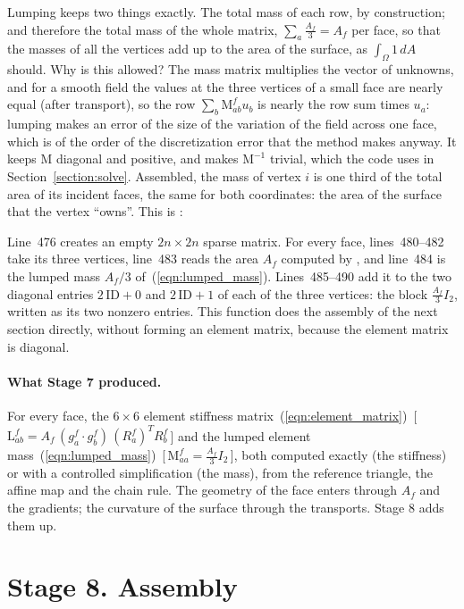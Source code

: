 Lumping keeps two things exactly. The total mass of each row, by construction; and therefore the total mass of the whole matrix, $\sum_a \frac{A_f}{3} = A_f$ per face, so that the masses of all the vertices add up to the area of the surface, as $\int_\Omega 1\, dA$ should. Why is this allowed? The mass matrix multiplies the vector of unknowns, and for a smooth field the values at the three vertices of a small face are nearly equal (after transport), so the row $\sum_b \mathrm M^f_{ab} u_b$ is nearly the row sum times $u_a$: lumping makes an error of the size of the variation of the field across one face, which is of the order of the discretization error that the method makes anyway. It keeps $\mathrm M$ diagonal and positive, and makes $\mathrm M^{-1}$ trivial, which the code uses in Section~\ref{section:solve}. Assembled, the mass of vertex $i$ is one third of the total area of its incident faces, the same for both coordinates: the area of the surface that the vertex ``owns''. This is :

Line~476 creates an empty $2n\times 2n$ sparse matrix. For every face, lines~480--482 take its three vertices, line~483 reads the area $A_f$ computed by , and line~484 is the lumped mass $A_f/3$ of~(\ref{eqn:lumped_mass}). Lines~485--490 add it to the two diagonal entries $2\,\mathrm{ID} + 0$ and $2\,\mathrm{ID} + 1$ of each of the three vertices: the block $\frac{A_f}{3}I_2$, written as its two nonzero entries. This function does the assembly of the next section directly, without forming an element matrix, because the element matrix is diagonal.

\paragraph{What Stage 7 produced.} For every face, the $6\times 6$ element stiffness matrix~(\ref{eqn:element_matrix})~[\,$\mathrm L^f_{ab} = A_f\,(g_a^f\cdot g_b^f)\,(R_a^f)^TR_b^f$\,] and the lumped element mass~(\ref{eqn:lumped_mass})~[\,$\mathrm M^f_{aa} = \tfrac{A_f}{3}I_2$\,], both computed exactly (the stiffness) or with a controlled simplification (the mass), from the reference triangle, the affine map and the chain rule. The geometry of the face enters through $A_f$ and the gradients; the curvature of the surface through the transports. Stage 8 adds them up.

\section{Stage 8. Assembly}
\label{section:assembly}

